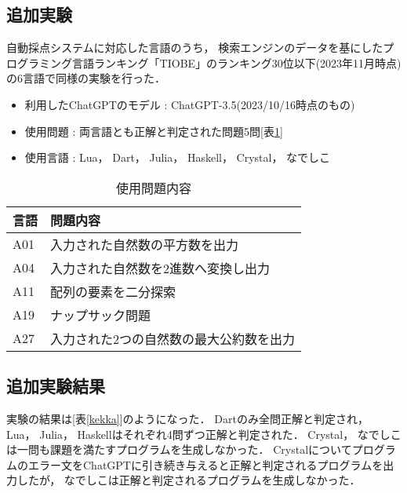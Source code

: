 \documentclass[a4j,twocolumn,9pt]{jarticle}
\begin{document}
\subsection{追加実験}
自動採点システムに対応した言語のうち， 検索エンジンのデータを基にしたプログラミング言語ランキング「TIOBE」のランキング30位以下(2023年11月時点)の6言語で同様の実験を行った． 
\begin{itemize}
    \item 利用したChatGPTのモデル : ChatGPT-3.5(2023/10/16時点のもの)
    \item 使用問題 : 両言語とも正解と判定された問題5問[表\ref{mondai}]
    \item 使用言語 : Lua， Dart， Julia， Haskell， Crystal， なでしこ

\end{itemize}

\begin{table}[h]
    \caption{使用問題内容}
    \label{mondai}
    \centering
    \begin{tabular}{l|l}
    \hline
    言語  & 問題内容\\ 
    \hline
    A01 & 入力された自然数の平方数を出力\\
    A04 & 入力された自然数を2進数へ変換し出力\\
    A11 & 配列の要素を二分探索\\
    A19 & ナップサック問題\\
    A27 & 入力された2つの自然数の最大公約数を出力\\
  \hline
  \end{tabular}
\end{table}

\subsection{追加実験結果}
実験の結果は[表\ref{kekka}]のようになった． 
Dartのみ全問正解と判定され，  Lua， Julia， Haskellはそれぞれ4問ずつ正解と判定された． 
Crystal， なでしこは一問も課題を満たすプログラムを生成しなかった． 
Crystalについてプログラムのエラー文をChatGPTに引き続き与えると正解と判定されるプログラムを出力したが， なでしこは正解と判定されるプログラムを生成しなかった．
\end{document}
